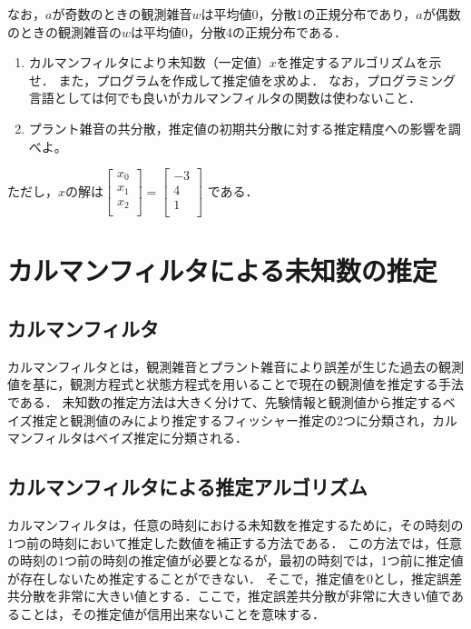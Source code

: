 \documentclass[a4paper]{jarticle}
\begin{document}
なお，$a$が奇数のときの観測雑音$w$は平均値0，分散1の正規分布であり，$a$が偶数のときの観測雑音の$w$は平均値0，分散4の正規分布である．　

\begin{enumerate}[(1)]
\item カルマンフィルタにより未知数（一定値）$x$を推定するアルゴリズムを示せ．
また，プログラムを作成して推定値を求めよ．
なお，プログラミング言語としては何でも良いがカルマンフィルタの関数は使わないこと．

\item プラント雑音の共分散，推定値の初期共分散に対する推定精度への影響を調べよ。
\end{enumerate}

ただし，$x$の解は\(
\begin{bmatrix}
{x_0} \\ {x_1} \\{x_2} \\ 
\end{bmatrix} =
\begin{bmatrix}
{-3} \\ {4} \\{1} \\ 
\end{bmatrix}
\)
である．

\newpage
\section{カルマンフィルタによる未知数の推定}
\subsection{カルマンフィルタ}
カルマンフィルタとは，観測雑音とプラント雑音により誤差が生じた過去の観測値を基に，観測方程式と状態方程式を用いることで現在の観測値を推定する手法である．
未知数の推定方法は大きく分けて、先験情報と観測値から推定するベイズ推定と観測値のみにより推定するフィッシャー推定の2つに分類され，カルマンフィルタはベイズ推定に分類される．

\subsection{カルマンフィルタによる推定アルゴリズム}
カルマンフィルタは，任意の時刻における未知数を推定するために，その時刻の1つ前の時刻において推定した数値を補正する方法である．
この方法では，任意の時刻の1つ前の時刻の推定値が必要となるが，最初の時刻では，1つ前に推定値が存在しないため推定することができない．
そこで，推定値を0とし，推定誤差共分散を非常に大きい値とする．ここで，推定誤差共分散が非常に大きい値であることは，その推定値が信用出来ないことを意味する．
\end{document}
